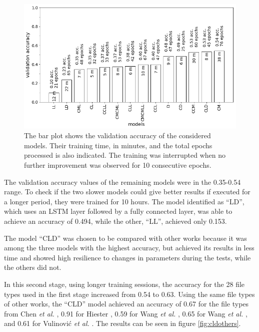 \noindent
\begin{figure}[htb!]
\centering\includegraphics[width=1.0\textwidth]{content/models.png}
\caption[Validation accuracy of models]{\label{fig:models}The bar plot shows the validation accuracy of the considered models. Their training time, in minutes, and the total epochs processed is also indicated. The training was interrupted when no further improvement was observed for 10 consecutive epochs.}%
\end{figure}

The validation accuracy values of the remaining models were in the 0.35-0.54 range.
To check if the two slower models could give better results if executed for a longer period, they were trained for 10 hours. The model identified as ``LD'', which uses an LSTM layer followed by a fully connected layer, was able to achieve an accuracy of 0.494, while the other, ``LL'', achieved only 0.153.

The model ``CLD'' was chosen to be compared with other works because it was among the three models with the highest accuracy, but achieved its results in less time and showed high resilience to changes in parameters during the tests, while the others did not.


In this second stage, using longer training sessions, the accuracy for the 28 file types used in the first stage increased from 0.54 to 0.63. Using the same file types of other works, the ``CLD'' model achieved an accuracy of 
0.67 for the file types from Chen \textit{et al.} \cite{chen_file_2018},
0.91 for Hiester \cite{hiester_file_2018}, 
0.59 for Wang \textit{et al.} \cite{wang_sparse_2018},
0.65 for Wang \textit{et al.} \cite{wang_file_2018},
and
0.61 for Vulinović \textit{et al.} \cite{vulinovic_neural_2019}.
The results can be seen in figure \ref{fig:cldothers}.

